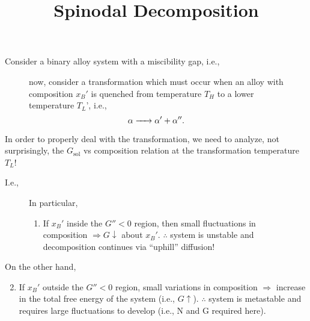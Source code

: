 \documentclass[12pt]{article}
\title{Spinodal Decomposition}
\author{}
\date{}
\begin{document}
\maketitle

Consider a binary alloy system with a miscibility gap,
i.e.,
\begin{figure}[h]
	\begin{minipage}[l]{0.3\textwidth}
		
	\end{minipage}%
	\hfil
	\begin{minipage}[r]{0.6\textwidth}
		now, consider a transformation which must occur when an alloy
		with composition $x_B'$ is quenched from temperature $T_H$
		to a lower temperature $T_L$', i.e.,
		\begin{equation*}
			\ce{$\alpha$ -> $\alpha' + \alpha''$}.
		\end{equation*}
	\end{minipage}
\end{figure}

In order to properly deal with the transformation, we need to analyze,
not surprisingly, the $G_{\text{sol}}$ vs composition relation at the
transformation temperature $T_L$!

I.e.,
\begin{figure}[h]
	\begin{minipage}[l]{0.3\textwidth}
		
	\end{minipage}%
	\hfil
	\begin{minipage}[r]{0.6\textwidth}
		In particular,
		\begin{enumerate}
			\item If $x_B'$ inside the $G''<0$ region, then small fluctuations
			      in composition $\Rightarrow G \downarrow$ about $x_B'$.
			      $\therefore$ system is unstable and decomposition continues via
			      ``uphill'' diffusion!
		\end{enumerate}
	\end{minipage}
\end{figure}

On the other hand,
\begin{enumerate}
	\setcounter{enumi}{1}
	\item If $x_B'$ outside the $G''<0$ region,
	      small variations in composition $\Rightarrow$ increase in the total
	      free energy of the system (i.e., $G \uparrow$).
	      $\therefore$ system is metastable and requires large fluctuations to
	      develop  (i.e., N and G required here).
\end{enumerate}
\end{document}
